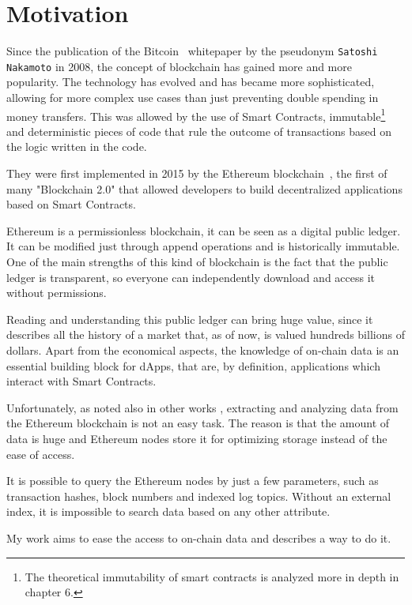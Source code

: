 
\section{Motivation}

Since the publication of the Bitcoin~\cite{bitcoin} whitepaper by the pseudonym {\tt Satoshi Nakamoto} in 2008, the concept of blockchain has gained more and more popularity. The technology has evolved and has became more sophisticated, allowing for more complex use cases than just preventing double spending in money transfers. This was allowed by the use of Smart Contracts, immutable\footnote{The theoretical immutability of smart contracts is analyzed more in depth in chapter 6.} and deterministic pieces of code that rule the outcome of transactions based on the logic written in the code.

They were first implemented in 2015 by the Ethereum blockchain~\cite{Ethereum}, the first of many "Blockchain 2.0" that allowed developers to build decentralized applications based on Smart Contracts. 

Ethereum is a permissionless blockchain, it can be seen as a digital public ledger. It can be modified just through append operations and is historically immutable. One of the main strengths of this kind of blockchain is the fact that the public ledger is transparent, so everyone can independently download and access it without permissions.

Reading and understanding this public ledger can bring huge value, since it describes all the history of a market that, as of now, is valued hundreds billions of dollars. Apart from the economical aspects, the knowledge of on-chain data is an essential building block for dApps, that are, by definition, applications which interact with Smart Contracts.

Unfortunately, as noted also in other works \cite{dataether,xblock-eth,ethereum_query_language}, extracting and analyzing data from the Ethereum blockchain is not an easy task. The reason is that the amount of data is huge and Ethereum nodes store it for optimizing storage instead of the ease of access. 

It is possible to query the Ethereum nodes by just a few parameters, such as transaction hashes, block numbers and indexed log topics. 
Without an external index, it is impossible to search data based on any other attribute.

My work aims to ease the access to on-chain data and describes a way to do it. 

